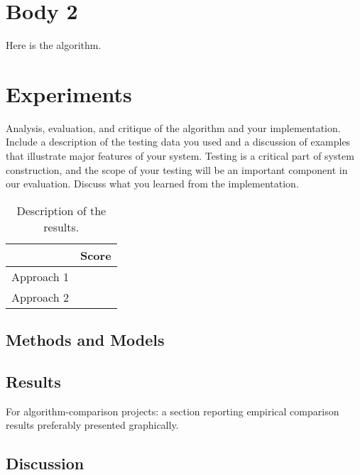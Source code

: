 \documentclass[11pt]{article}
\begin{document}
\begin{multicols}{2}
\section{Body 2}


\begin{algorithm}
  \begin{algorithmic}
    \EndProcedure{}
  \end{algorithmic}
  \caption{Here is the algorithm.}
\end{algorithm}



\section{Experiments}
Analysis, evaluation, and critique of the algorithm and your
implementation. Include a description of the testing data you used and
a discussion of examples that illustrate major features of your
system. Testing is a critical part of system construction, and the
scope of your testing will be an important component in our
evaluation. Discuss what you learned from the implementation.

\begin{table}
  \centering
  \begin{tabular}{ll}
    \toprule
    & Score \\
    \midrule
    Approach 1 & \\
    Approach 2 & \\
    \bottomrule
  \end{tabular}
  \caption{Description of the results.}
\end{table}

\subsection{Methods and Models}


\subsection{Results}

 For algorithm-comparison projects: a section reporting empirical comparison results preferably presented graphically.


\subsection{Discussion}



\end{multicols}
\end{document}
